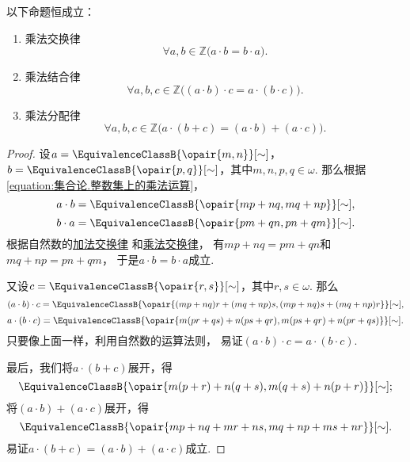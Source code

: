 \begin{theorem}\label{theorem:集合论.整数乘法的运算法则1}
以下命题恒成立：
\begin{enumerate}
	\item 乘法交换律
	\begin{equation}\label{equation:集合论.整数乘法交换律}
		\forall a,b\in\mathbb{Z} \bigl(
			a \cdot b = b \cdot a
		\bigr).
	\end{equation}
	\item 乘法结合律
	\begin{equation}\label{equation:集合论.整数乘法结合律}
		\forall a,b,c\in\mathbb{Z} \bigl(
			(a \cdot b) \cdot c = a \cdot (b \cdot c)
		\bigr).
	\end{equation}
	\item 乘法分配律
	\begin{equation}\label{equation:集合论.整数乘法分配律}
		\forall a,b,c\in\mathbb{Z} \bigl(
			a \cdot (b + c) = (a \cdot b) + (a \cdot c)
		\bigr).
	\end{equation}
\end{enumerate}
\begin{proof}
设\(a=\EquivalenceClassB{\opair{m,n}}[\sim]\)，\(b=\EquivalenceClassB{\opair{p,q}}[\sim]\)，其中\(m,n,p,q\in\omega\).
那么根据\cref{equation:集合论.整数集上的乘法运算}，\begin{equation*}
	a \cdot b = \EquivalenceClassB{\opair{mp+nq,mq+np}}[\sim],
\end{equation*}\begin{equation*}
	b \cdot a = \EquivalenceClassB{\opair{pm+qn,pn+qm}}[\sim].
\end{equation*}
根据自然数的\hyperref[equation:集合论.自然数加法交换律]{加法交换律}%
和\hyperref[equation:集合论.自然数乘法交换律]{乘法交换律}，
有\(mp+nq=pm+qn\)和\(mq+np=pn+qm\)，
于是\(a \cdot b = b \cdot a\)成立.

又设\(c=\EquivalenceClassB{\opair{r,s}}[\sim]\)，其中\(r,s\in\omega\).
那么\begin{equation*}
	(a \cdot b) \cdot c
	= \EquivalenceClassB{\opair{(mp+nq)r+(mq+np)s,(mp+nq)s+(mq+np)r}}[\sim],
\end{equation*}\begin{equation*}
	a \cdot (b \cdot c)
	= \EquivalenceClassB{\opair{m(pr+qs)+n(ps+qr),m(ps+qr)+n(pr+qs)}}[\sim].
\end{equation*}
只要像上面一样，利用自然数的运算法则，
易证\((a \cdot b) \cdot c = a \cdot (b \cdot c)\).

最后，我们将\(a \cdot (b+c)\)展开，得\begin{equation*}
	\EquivalenceClassB{\opair{m(p+r)+n(q+s),m(q+s)+n(p+r)}}[\sim];
\end{equation*}
将\((a \cdot b) + (a \cdot c)\)展开，得\begin{equation*}
	\EquivalenceClassB{\opair{mp+nq+mr+ns,mq+np+ms+nr}}[\sim].
\end{equation*}
易证\(a \cdot (b + c) = (a \cdot b) + (a \cdot c)\)成立.
\end{proof}
\end{theorem}

